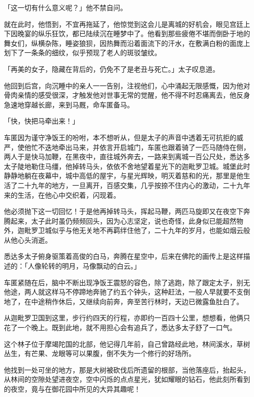 \documentclass[twoside,openany]{book}
\begin{document}
「这一切有什么意义呢？」他不禁自问。

就在此时，他悟到，不宜再拖延了，他惊觉到这会儿是离城的好机会，眼见宫廷上下因晚宴的纵乐狂饮，都已陆续沉在睡梦中了。他看到那些疲倦不堪而倒卧于地的舞女们，纵横杂陈，睡姿狼狈，因热舞而沿着面流下的汗水，在敷满白粉的面庞上划下了一条条的细纹，似乎预现了老人的斑驳皱纹。

「再美的女子，隐藏在背后的，仍免不了是老丑与死亡。」太子叹息道。

他回到后宫，向沉睡中的亲人一一告别，注视他们，心中涌起无限感慨，因为他对骨肉亲情的感受很深，才触发他对世事无常的觉醒，他不得不时忍痛离去，他反身急速地穿越长廊，来到马厩，命车匿备马。

「快，快把马牵出来！」

车匿因为谨守净饭王的吩咐，本不想听从，但是太子的声音中透着无可抗拒的威严，使他忙不迭地牵出马来，并依言开启城门，车匿也跟着骑了一匹马随侍在侧，两人于是快马加鞭，在黑夜中，直往城外奔去，一路来到离城一百公尺处，悉达多太子陡地勒住马缰，他掉转马头，依依不舍地望着星光下的迦毗罗卫城。城堡此时静静地躺在夜幕中，城中高低的屋宇，与星光辉映，明灭着慈和的光，那里是他生活了二十九年的地方，一旦离开，百感交集，几乎按捺不住内心的激动，二十九年来的生活，在他心中交织着，闪现着。

他必须抛下这一切回忆！于是他再掉转马头，挥起马鞭，两匹马旋即又在夜空下奔腾起来，太子此时虽仍频频回头，因为心志坚定，说也奇怪，此身似已能超然物外，迦毗罗卫城似乎与他无关地不再羁绊住他了，二十九年的岁月，也能如烟云般从他心头消逝。

悉达多太子俯身驱策着高俊的白马，奔腾在星空中，后来在佛陀的画传上是这样描述的：「人像轮转的明月，马像飘动的白云。」

车匿紧随在后，脑中不断出现净饭王震怒的容色，除了逃跑，除了跟定太子，别无他途，两人就这样马不停蹄地奔驰了约五个钟头，这种赶法，一般人早就要不支倒地了，在中途稍作休后，又继续向前奔，奔至苦行林时，天边已微露鱼肚白了。

从迦毗罗卫国到这里，步行约四天的行程，亦即约一百四十公里，想想看，他俩只花了一个晚上。既到此地，就不用担心会有追兵了，悉达多太子舒了一口气。

这个林子位于摩竭陀国的北部，他记得几年前，自己曾路经此地，林间溪水，草树丛生，有芒果、龙眼等可以果腹，倒不失为一个修行的好场所。

他找到一处可坐的地方，那是大树被砍伐后所遗留的根部，当他落座后，抬起头，从林间的空隙处望进夜空，空中闪烁的点点星光，犹如耀眼的钻石，他此刻所看到的夜空，竟与在御花园中所见的大异其趣呢！
\end{document}
